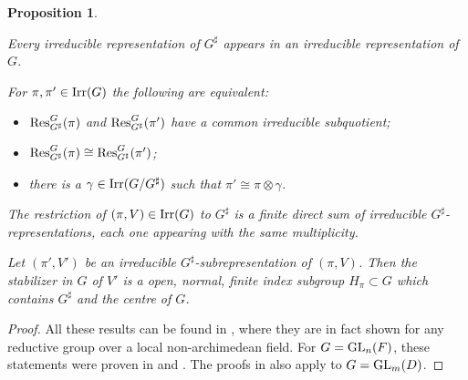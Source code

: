\documentclass[11pt]{amsart}
\newtheorem{prop}[thm]{Proposition}
\theoremstyle{definition}
\begin{document}
\begin{prop}\label{prop:2.6}
{\begin{enumerate} {{
\item Every irreducible representation of $G^\sharp$ appears in an irreducible
representation of $G$.
\item For $\pi, \pi' \in {{\rm Irr}} (G)$ the following are equivalent:
\begin{itemize}
\item[(i)] ${{\rm Res}}_{G^\sharp}^G (\pi)$ and ${{\rm Res}}_{G^\sharp}^G (\pi')$ 
have a common irreducible subquotient;
\item[(ii)] ${{\rm Res}}_{G^\sharp}^G (\pi) \cong {{\rm Res}}_{G^\sharp}^G (\pi')$;
\item[(iii)] there is a $\gamma \in {{\rm Irr}} (G/G^\sharp)$ such that $\pi' \cong \pi \otimes \gamma$.
\end{itemize}
\item The restriction of $(\pi,V) \in {{\rm Irr}} (G)$ to $G^\sharp$ is a finite direct sum of 
irreducible $G^\sharp$-representations, each one appearing with the same multiplicity.
\item Let $(\pi',V')$ be an irreducible $G^\sharp$-subrepresentation of $(\pi,V)$. 
Then the stabilizer in $G$ of $V'$ is a open, normal, finite index subgroup 
$H_\pi \subset G$ which contains $G^\sharp$ and the centre of $G$.
}} \end{enumerate}} 
\end{prop}
\begin{proof}
All these results can be found in \cite[\S 2]{Tad}, where they are in fact shown for
any reductive group over a local non-archimedean field.
For $G = {{\rm GL}}_n (F)$, these statements were proven in \cite[Propositions 1.7 and 1.17]{BuKu1}
and \cite[Proposition 1.5]{BuKu2}. The proofs in \cite{BuKu1,BuKu2} also apply to $G = {{\rm GL}}_m (D)$. 
\end{proof}
\end{document}
